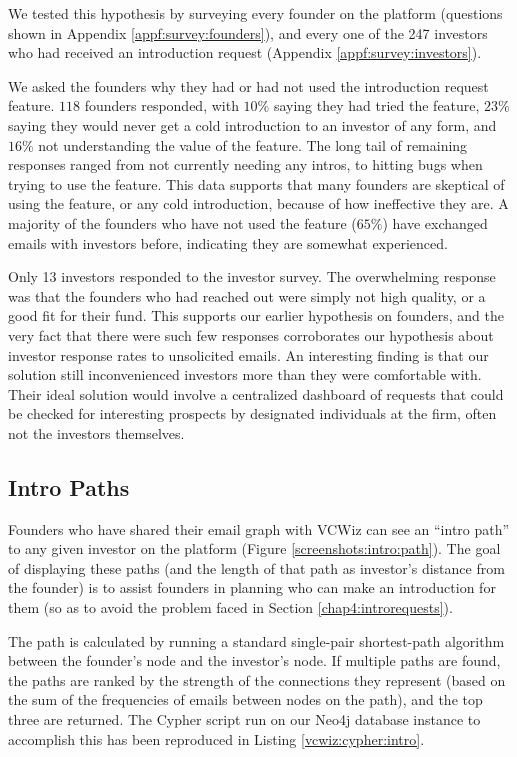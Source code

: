 We tested this hypothesis by surveying every founder on the platform (questions shown in Appendix \ref{appf:survey:founders}), and every one of the 247 investors who had received an introduction request (Appendix \ref{appf:survey:investors}).

We asked the founders why they had or had not used the introduction request feature. $118$ founders responded, with $10\%$ saying they had tried the feature, $23\%$ saying they would never get a cold introduction to an investor of any form, and $16\%$ not understanding the value of the feature. The long tail of remaining responses ranged from not currently needing any intros, to hitting bugs when trying to use the feature. This data supports that many founders are skeptical of using the feature, or any cold introduction, because of how ineffective they are. A majority of the founders who have not used the feature ($65\%$) have exchanged emails with investors before, indicating they are somewhat experienced.

Only 13 investors responded to the investor survey. The overwhelming response was that the founders who had reached out were simply not high quality, or a good fit for their fund. This supports our earlier hypothesis on founders, and the very fact that there were such few responses corroborates our hypothesis about investor response rates to unsolicited emails. An interesting finding is that our solution still inconvenienced investors more than they were comfortable with. Their ideal solution would involve a centralized dashboard of requests that could be checked for interesting prospects by designated individuals at the firm, often not the investors themselves.

\subsection{Intro Paths}
\label{chap4:intropaths}

Founders who have shared their email graph with VCWiz can see an ``intro path'' to any given investor on the platform (Figure \ref{screenshots:intro:path}). The goal of displaying these paths (and the length of that path as investor's distance from the founder) is to assist founders in planning who can make an introduction for them (so as to avoid the problem faced in Section \ref{chap4:introrequests}).

The path is calculated by running a standard single-pair shortest-path algorithm between the founder's node and the investor's node. If multiple paths are found, the paths are ranked by the strength of the connections they represent (based on the sum of the frequencies of emails between nodes on the path), and the top three are returned. The Cypher script run on our Neo4j database instance to accomplish this has been reproduced in Listing \ref{vcwiz:cypher:intro}.

